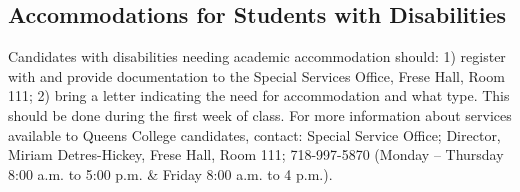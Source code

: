 \subsection*{Accommodations for Students with Disabilities}
 
Candidates with disabilities needing academic accommodation should: 1) register with and provide documentation to the Special Services Office, Frese Hall, Room 111; 2) bring a letter indicating the need for accommodation and what type. This should be done during the first week of class. For more information about services available to Queens College candidates, contact: Special Service Office; Director, Miriam Detres-Hickey, Frese Hall, Room 111; 718-997-5870 (Monday – Thursday 8:00 a.m. to 5:00 p.m. \& Friday 8:00 a.m. to 4 p.m.).